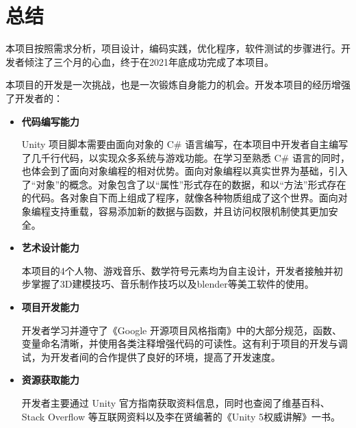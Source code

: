 
\chapter{总结}

本项目按照需求分析，项目设计，编码实践，优化程序，软件测试的步骤进行。开发者倾注了三个月的心血，终于在2021年底成功完成了本项目。

本项目的开发是一次挑战，也是一次锻炼自身能力的机会。开发本项目的经历增强了开发者的：

\begin{itemize}

\item \textbf{代码编写能力}

Unity 项目脚本需要由面向对象的 C\# 语言编写，在本项目中开发者自主编写了几千行代码，以实现众多系统与游戏功能。在学习至熟悉 C\# 语言的同时，也体会到了面向对象编程的相对优势。面向对象编程以真实世界为基础，引入了“对象”的概念。对象包含了以“属性”形式存在的数据，和以“方法”形式存在的代码。各对象自下而上组成了程序，就像各种物质组成了这个世界。面向对象编程支持重载，容易添加新的数据与函数，并且访问权限机制使其更加安全。

\item \textbf{艺术设计能力}

本项目的4个人物、游戏音乐、数学符号元素均为自主设计，开发者接触并初步掌握了3D建模技巧、音乐制作技巧以及blender等美工软件的使用。

\item \textbf{项目开发能力}

开发者学习并遵守了《Google 开源项目风格指南》中的大部分规范，函数、变量命名清晰，并使用各类注释增强代码的可读性。这有利于项目的开发与调试，为开发者间的合作提供了良好的环境，提高了开发速度。

\item \textbf{资源获取能力}

开发者主要通过 Unity 官方指南获取资料信息，同时也查阅了维基百科、Stack Overflow 等互联网资料以及李在贤编著的《Unity 5权威讲解》一书。

\end{itemize}
